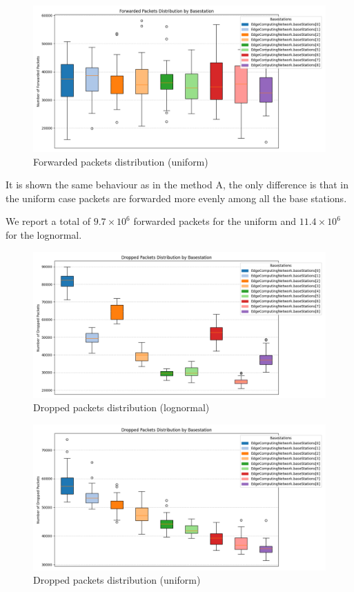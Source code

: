 \documentclass{report}
\begin{document}
\begin{figure}[H]
    \centering
    \includegraphics[width=\textwidth]{img/plots/uni_1e4_B/forwarded.png}
    \caption{Forwarded packets distribution (uniform)}
\end{figure}

\begin{flushleft}
It is shown the same behaviour as in the method A, the only difference is that in the uniform case packets are forwarded more evenly among all the base stations.
\vspace{1em}

We report a total of $9.7\times10^6$ forwarded packets for the uniform and $11.4\times10^6$ for the lognormal.
\end{flushleft}

\begin{figure}[H]
    \centering
    \includegraphics[width=\textwidth]{img/plots/log_1e4_B/dropped.png}
    \caption{Dropped packets distribution (lognormal)}
\end{figure}

\begin{figure}[H]
    \centering
    \includegraphics[width=\textwidth]{img/plots/uni_1e4_B/dropped.png}
    \caption{Dropped packets distribution (uniform)}
\end{figure}
\end{document}
